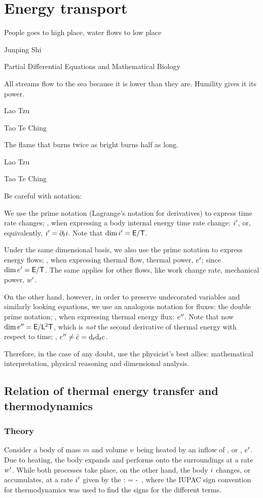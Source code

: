 \section{Energy transport}
\epigraph{People goes to high place, water flows to low place}{Junping Shi}
    {Partial Differential Equations and Mathematical Biology}
\epigraph{All streams flow to the sea because it is lower than they are. Humility gives it its power.}{Lao Tzu}{Tao Te Ching}
\epigraph{The flame that burns twice as bright burns half as long.}{Lao Tzu}{Tao Te Ching}

Be careful with notation:

\begin{caution}
We use the prime notation (Lagrange's notation for derivatives) to express time rate changes; \eg, when expressing a body internal energy time rate change: ${i}^{\prime}$, or, equivalently, ${i}^{\prime} = \partial_{t}i$. Note that $\dim{i}^{\prime} = \mathsf{E}/\mathsf{T}$.

Under the same dimensional basis, we also use the prime notation to express energy flows; \eg, when expressing thermal flow, \aka thermal power, ${e}^{\prime}$; since $\dim{e}^{\prime} = \mathsf{E}/\mathsf{T}$. The same applies for other flows, like work change rate, \aka mechanical power, ${w}^{\prime}$.

On the other hand, however, in order to preserve undecorated variables and similarly looking equations, we use an analogous notation for fluxes: the double prime notation; \eg, when expressing thermal energy flux: ${e}^{\prime\prime}$. Note that now $\dim{e}^{\prime\prime} = \mathsf{E}/\mathsf{L}^2\mathsf{T}$, which is \emph{not} the second derivative of thermal energy with respect to time; \ie, ${e}^{\prime\prime} \neq \ddot{e} = \text{d}_{t}{\text{d}_{t}e}$.

Therefore, in the case of any doubt, use the physicist's best allies: mathematical interpretation, physical reasoning and dimensional analysis.
\end{caution}


\subsection{Relation of thermal energy transfer and thermodynamics}

\subsubsection{Theory}
Consider a body of mass $m$ and volume $v$ being heated by an inflow of , \aka {} or , ${e}^{\prime}$. Due to heating, the body expands and performs  onto the surroundings at a rate ${w}^{\prime}$. While both processes take place, on the other hand, the body  $i$ changes, or accumulates, at a rate ${i}^{\prime}$ given by the :
\beq
\rate\ien = \flow\then - \flow\work\,,
\eeq
where the IUPAC sign convention for thermodynamics was used to find the signs for the different terms.

